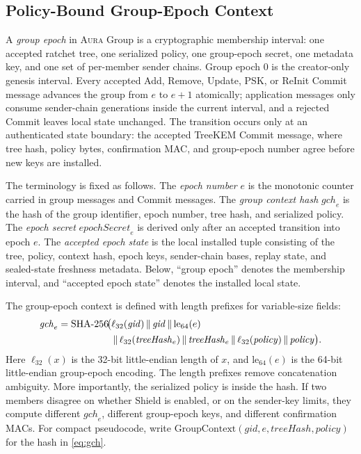 \documentclass[preprint,12pt]{elsarticle}
\theoremstyle{definition}
\newcommand{\tech}[1]{\textnormal{#1}}
\renewcommand{\mathsf}[1]{\mathrm{#1}}
\newcommand{\Aura}{\textsc{Aura}}
\newcommand{\Shield}{\tech{Shield}}
\newcommand{\SHA}{\tech{SHA-256}}
\newcommand{\concat}{\,\|\,}
\newcommand{\gid}{\mathit{gid}}
\newcommand{\gch}{\mathit{gch}}
\newcommand{\epochsec}{\mathit{epochSecret}}
\newcommand{\policy}{\mathit{policy}}
\newcommand{\treehash}{\mathit{treeHash}}
\begin{document}
\subsection{Policy-Bound Group-Epoch Context}

A \emph{group epoch} in \Aura{} Group is a cryptographic membership interval:
one accepted ratchet tree, one serialized policy, one group-epoch secret, one
metadata key, and one set of per-member sender chains. Group epoch $0$ is the
creator-only genesis interval. Every accepted Add, Remove, Update, PSK, or
ReInit Commit message advances the group from $e$ to $e+1$ atomically; application
messages only consume sender-chain generations inside the current interval,
and a rejected Commit leaves local state unchanged. The transition occurs only
at an authenticated state boundary: the accepted TreeKEM Commit message, where
tree hash, policy bytes, confirmation MAC, and group-epoch number agree before
new keys are installed.

The terminology is fixed as follows. The \emph{epoch number} $e$ is the
monotonic counter carried in group messages and Commit messages. The
\emph{group context hash} $\gch_e$ is the hash of the group identifier, epoch
number, tree hash, and serialized policy. The \emph{epoch secret}
$\epochsec_e$ is derived only after an accepted transition into epoch $e$. The
\emph{accepted epoch state} is the local installed tuple consisting of the
tree, policy, context hash, epoch keys, sender-chain bases, replay state, and
sealed-state freshness metadata. Below, ``group epoch'' denotes the membership
interval, and ``accepted epoch state'' denotes the installed local state.

The group-epoch context is defined with length prefixes for variable-size fields:
\begin{equation}
\begin{aligned}
  \gch_e =
  \SHA\!\bigl(&
    \ell_{32}(\gid)\concat \gid \concat
    \mathrm{le}_{64}(e)\\
    &\concat\ell_{32}(\treehash_e)\concat \treehash_e
    \concat\ell_{32}(\policy)\concat \policy
  \bigr).
\end{aligned}
  \label{eq:gch}
\end{equation}
Here $\ell_{32}(x)$ is the 32-bit little-endian length of $x$, and
$\mathrm{le}_{64}(e)$ is the 64-bit little-endian group-epoch encoding. The length
prefixes remove concatenation ambiguity. More importantly, the serialized
policy is inside the hash. If two members disagree on whether
\Shield{} is enabled, or on the sender-key limits, they compute different
$\gch_e$, different group-epoch keys, and different confirmation MACs.
For compact pseudocode, write
$\mathsf{GroupContext}(\gid,e,\treehash,\policy)$ for the hash in
\cref{eq:gch}.
\end{document}
